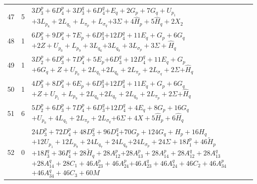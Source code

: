\documentclass[11pt,a4paper]{article}
\theoremstyle{remark}
\begin{document}
\begin{longtable}{rrp{12.7cm}}
47&5&\( 3D_3^p + 6D_4^p + 3D_3^q + 6D_4^q \)\newline\( + E_q + 2G_p + 7G_q + U_{p_{1}} \)\newline\( + 3L_{p_{8}} + 2L_{q_{5}} + L_{\pi_p} + L_{\sigma_q} \)\newline\( + 3\Sigma + 4\widehat H_p + 5\widehat H_q + 2X_2 \)\\[3pt]
48&1&\( 6D_3^p + 9D_4^p + 7E_p + 6D_3^q \)\newline\( + 12D_4^q + 11E_q + G_p + 6G_q \)\newline\( + 2Z + U_{p_{0}} + L_{p_{9}} + 3L_{q_{6}} \)\newline\( + 3L_{q_{9}} + 3L_{\sigma_p} + 3\Sigma + \widehat H_q \)\\[3pt]
49&1&\( 3D_2^p + 6D_3^p + 7D_4^p + 5E_p \)\newline\( + 6D_3^q + 12D_4^q + 11E_q + G_p \)\newline\( + 6G_q + Z + U_{p_{0}} + 2L_{q_{5}} \)\newline\( + 2L_{q_{6}} + 2L_{\pi_p} + 2L_{\sigma_q} + 2\Sigma \)\newline\( + \widehat H_q \)\\[3pt]
50&1&\( 4D_3^p + 8D_4^p + 6E_p + 6D_3^q \)\newline\( + 12D_4^q + 11E_q + G_p + 6G_q \)\newline\( + Z + U_{p_{1}} + L_{p_{9}} + 2L_{q_{6}} \)\newline\( + 2L_{q_{7}} + 2L_{q_{9}} + 2L_{\pi_p} + 2\Sigma \)\newline\( + \widehat H_q \)\\[3pt]
51&6&\( 5D_2^p + 6D_3^p + 7D_4^p + 6D_3^q \)\newline\( + 12D_4^q + 4E_q + 8G_p + 16G_q \)\newline\( + U_{p_{0}} + 4L_{q_{5}} + 2L_{\pi_p} + 2L_{\sigma_q} \)\newline\( + 6\Sigma + 4X + 5\widehat H_p + 6\widehat H_q \)\\[3pt]
52&0&\( 24D_3^p + 72D_4^p + 48D_3^q + 96D_4^q \)\newline\( + 70G_p + 124G_q + H_p + 16H_q \)\newline\( + 12U_{p_{1}} + 12L_{p_{9}} + 24L_{q_{7}} + 24L_{q_{9}} \)\newline\( + 24L_{\sigma_p} + 24\Sigma + 18I_1^p + 46\widetilde H_p \)\newline\( + 18I_3^q + 36I_4^q + 28\widetilde H_q + 28A_{12}^p \)\newline\( + 28A_{13}^p + 28A_{14}^p + 28A_{12}^q + 28A_{13}^q \)\newline\( + 28A_{14}^q + 28C_1 + 46A_{23}^p + 46A_{24}^p \)\newline\( + 46A_{23}^q + 46A_{24}^q + 46C_2 + 46A_{34}^p \)\newline\( + 46A_{34}^q + 46C_3 + 60M \)\\[3pt]

\end{longtable}
\end{document}
